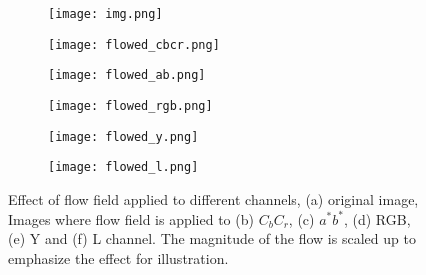 \begin{figure}[t]
    \centering
    \begin{subfigure}[b]{.30\linewidth}
        \texttt{[image: img.png]}
        \caption{}
    \end{subfigure}
    \begin{subfigure}[b]{.30\linewidth}
        \texttt{[image: flowed\_cbcr.png]}
        \caption{}
    \end{subfigure}
    \begin{subfigure}[b]{.30\linewidth}
        \texttt{[image: flowed\_ab.png]}
        \caption{}
    \end{subfigure}
    \begin{subfigure}[b]{.30\linewidth}
        \texttt{[image: flowed\_rgb.png]}
        \caption{}
    \end{subfigure}
    \begin{subfigure}[b]{.30\linewidth}
        \texttt{[image: flowed\_y.png]}
        \caption{}
    \end{subfigure}
    \begin{subfigure}[b]{.30\linewidth}
        \texttt{[image: flowed\_l.png]}
        \caption{}
    \end{subfigure}
    \caption[Effect of flow field applied to different channels]{Effect of flow field applied to different channels, (a) original image, Images where flow field is applied to (b) \(C_{b}C_{r}\), (c) \(a^*b^*\), (d) RGB, (e) Y and (f) L channel. The magnitude of the flow is scaled up to emphasize the effect for illustration.}\label{fig:flowtochannels}
\end{figure}

